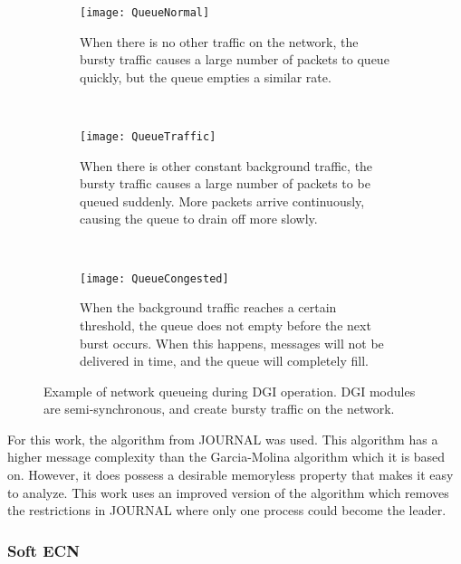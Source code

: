 \begin{figure}
    \centering
    \begin{subfigure}[t]{0.3\textwidth}
        \texttt{[image: QueueNormal]}
        \caption{When there is no other traffic on the network, the bursty traffic causes a large number of packets to queue quickly, but the queue empties a similar rate.}
        \label{fig:queue-normal}
    \end{subfigure}
    ~ %
    \begin{subfigure}[t]{0.3\textwidth}
        \texttt{[image: QueueTraffic]}
        \caption{When there is other constant background traffic, the bursty traffic causes a large number of packets to be queued suddenly. More packets arrive continuously, causing the queue to drain off more slowly.}
        \label{fig:queue-traffic}
    \end{subfigure}
    ~ %
    \begin{subfigure}[t]{0.3\textwidth}
        \texttt{[image: QueueCongested]}
        \caption{When the background traffic reaches a certain threshold, the queue does not empty before the next burst occurs. When this happens, messages will not be delivered in time, and the queue will completely fill.}
        \label{fig:queue-congested}
    \end{subfigure}
    \caption{Example of network queueing during \ac{DGI} operation. \ac{DGI} modules are semi-synchronous, and create bursty traffic on the network.}\label{fig:queue-types}
\end{figure}

For this work, the algorithm from JOURNAL was used.
This algorithm has a higher message complexity than the Garcia-Molina algorithm which it is based on.
However, it does possess a desirable memoryless property that makes it easy to analyze.
This work uses an improved version of the algorithm which removes the restrictions in JOURNAL where only one process could become the leader.

\subsubsection{Soft \ac{ECN}}

